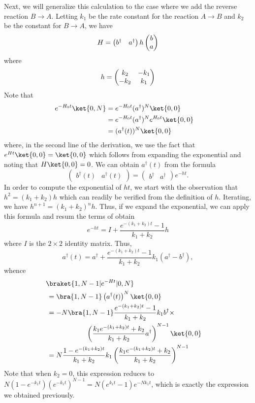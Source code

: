 Next, we will generalize this calculation to the case where we add the reverse reaction $B \to A$.  Letting $k_1$ be the rate constant for the reaction $A \to B$ and $k_2$ be the constant for $B \to A$, we have
\[
 H = \begin{pmatrix} b^\dagger & a^\dagger \end{pmatrix} h \begin{pmatrix} b \cr a \end{pmatrix}
\]
where
\[
 h = \begin{pmatrix} k_2 & -k_1 \cr -k_2 & k_1 \end{pmatrix}
\]
Note that
\begin{align*}
 e^{-H_0 t} \ket{0, N} &=
 e^{-H_0 t} (a^\dagger)^N \ket{0, 0} \cr &=
 e^{-H_0 t} (a^\dagger)^N e^{H_0 t} \ket{0, 0} \cr &=
 (a^\dagger (t))^N \ket{0, 0}
\end{align*}
where, in the second line of the derivation, we use the fact that $e^{Ht} \ket{0, 0} = \ket{0, 0}$ which follows from expanding the exponential and noting that $H \ket{0, 0} = 0$.  We can obtain $a^\dagger (t)$ from the formula
\[
 \begin{pmatrix} b^\dagger(t) & a^\dagger(t) \end{pmatrix} =
 \begin{pmatrix} b^\dagger & a^\dagger \end{pmatrix} e^{-ht} .
\]
In order to compute the exponential of $ht$, we start with the observation that $h^2 = (k_1 + k_2) h$ which can readily be verified from the definition of $h$.  Iterating, we have $h^{n+1} = (k_1 + k_2)^n h$.  Thus, if we expand the exponential, we can apply this formula and resum the terms of obtain
\[
 e^{-ht} = I + \frac{e^{-(k_1 + k_2) t} - 1}{k_1 + k_2} h
\]
where $I$ is the $2 \times 2$ identity matrix.  Thus,
\[
 a^\dagger (t) = a^\dagger +
 \frac{e^{-(k_1 + k_2) t} - 1}{k_1 + k_2} k_1 (a^\dagger - b^\dagger) ,
\]
whence
\begin{align*}
 &\!\braket{1, N-1 | e^{-Ht} | 0, N} \cr &=
 \bra{1, N-1} \left( a^\dagger (t) \right)^N \ket{0, 0} \cr &=
 -N \bra{1, N-1} \frac{e^{-(k_1 + k_2) t} - 1}{k_1 + k_2} k_1 b^\dagger \times \cr
   &\hskip2cm \left( \frac{k_1 e^{-(k_1 + k_2) t} + k_2}{k_1 + k_2} a^\dagger \right)^{N-1} \ket{0, 0} \cr &=
 N \frac{1 - e^{-(k_1 + k_2) t}}{k_1 + k_2} k_1 \left( \frac{k_1 e^{-(k_1 + k_2) t} + k_2}{k_1 + k_2} \right)^{N-1}
\end{align*}
Note that when $k_2 = 0$, this expression reduces to $N(1-e^{-k_1 t})(e^{-k_1 t})^{N-1} =N (e^{k_1 t} - 1) e^{-N k_1 t}$, which is exactly the expression we obtained previously.

